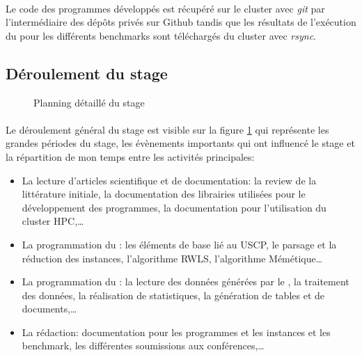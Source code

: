 \documentclass[a4paper,11pt,twoside,french,report]{../common/simplem}
\begin{document}
				\paragraph*{}
					Le code des programmes développés est récupéré sur le cluster avec \textit{git} par l'intermédiaire des dépôts privés sur Github tandis que les résultats de l’exécution du \solver{} pour les différents benchmarks sont téléchargés du cluster avec \textit{rsync}.
			\subsection{Déroulement du stage}\label{sec:planning}
				\begin{landscape}
					\begin{figure}[H]
						\centering%
						\hspace*{-0.5cm}
						\caption{Planning détaillé du stage}%
						\label{fig:planning}%
					\end{figure}
				\end{landscape}
				\paragraph*{}
					Le déroulement général du stage est visible sur la figure \ref{fig:planning} qui représente les grandes périodes du stage, les évènements importants qui ont influencé le stage et la répartition de mon temps entre les activités principales:
					\begin{itemize}
						\item La lecture d'articles scientifique et de documentation: la review de la littérature initiale, la documentation des librairies utilisées pour le développement des programmes, la documentation pour l'utilisation du cluster \gls{HPC},\ldots
						\item La programmation du \solver{}: les éléments de base lié au \gls{USCP}, le parsage et la réduction des instances, l'algorithme \gls{RWLS}, l'algorithme Mémétique\ldots
						\item La programmation du \printer{}: la lecture des données générées par le \solver{}, la traitement des données, la réalisation de statistiques, la génération de tables et de documents,\ldots
						\item La rédaction: documentation pour les programmes et les instances et les benchmark, les différentes soumissions aux conférences,\ldots
					\end{itemize}
\end{document}
